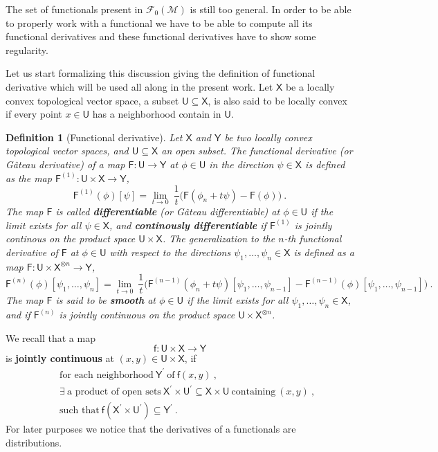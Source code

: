 \documentclass[11pt]{book}
\newcommand{\Fcal}{\mathcal{F}}
\newcommand{\Mcal}{\mathcal{M}}
\newcommand{\Fsf}{\mathsf{F}}
\newcommand{\Usf}{\mathsf{U}}
\newcommand{\Xsf}{\mathsf{X}}
\newcommand{\Ysf}{\mathsf{Y}}
\newcommand{\fsf}{\mathsf{f}}
\theoremstyle{break}
\newtheorem{definition}{Definition}[chapter]
\begin{document}
The set of functionals present in $\Fcal_0(\Mcal)$ is still too general. In order to be able to properly work with a functional we have to be able to compute all its functional derivatives and these functional derivatives have to show some regularity.


Let us start formalizing this discussion giving the definition of functional derivative which will be used all along in the present work. Let $\Xsf$ be a locally convex topological vector space, a subset $\Usf \subseteq \Xsf$, is also said to be locally convex if every point $x \in \Usf$ has a neighborhood contain in $\Usf$. 


\begin{definition}[Functional derivative]\label{def:functional_derivative}
Let $\Xsf$ and $\Ysf$ be two locally convex topological vector spaces, and $\Usf \subseteq \Xsf$ an open subset. The functional derivative (or Gâteau derivative) of a map $\Fsf:  \Usf \to \Ysf$ at $\phi \in \Usf$ in the direction $\psi \in \Xsf$ is defined as the map $\Fsf^{(1)} : \Usf \times \Xsf \to \Ysf$,
%
\begin{equation*}
\Fsf^{(1)}(\phi)[\psi] = \lim_{t \to 0} \ \frac{1}{t} \bigg( \Fsf(\phi_n + t \psi) - \Fsf(\phi) \bigg) \ .
\end{equation*}
% 
The map $\Fsf$ is called \textbf{differentiable} (or Gâteau differentiable) at $\phi \in \Usf$ if the limit exists for all $\psi \in \Xsf$, and \textbf{continously differentiable} if $\Fsf^{(1)}$ is jointly continous on the product space $\Usf \times \Xsf$.
%
%
The generalization to the $n$-th functional derivative of $\Fsf$ at $\phi \in \Usf$ with respect to the directions $\psi_1, \dots, \psi_n \in \Xsf$ is defined as a map $\Fsf : \Usf \times \Xsf^{\otimes n} \to \Ysf$,
%
\begin{equation*}
\Fsf^{(n)}(\phi)[\psi_1,\dots ,\psi_n] = \lim_{t \to 0} \ \frac{1}{t} \bigg( \Fsf^{(n-1)}(\phi_n + t \psi)[\psi_1,\dots ,\psi_{n-1}] - \Fsf^{(n-1)}(\phi)[\psi_1,\dots ,\psi_{n-1}] \bigg) \ .
\end{equation*}
%
The map $\Fsf$ is said to be \textbf{smooth} at $\phi \in \Usf$ if the limit exists for all $\psi_1, \dots, \psi_n \in \Xsf$, and if $\Fsf^{(n)}$ is jointly continuous on the product space $\Usf \times \Xsf^{\otimes n}$.
\end{definition}


We recall that a map 
%
\begin{equation*}
\fsf : \Usf \times \Xsf \to \Ysf
\end{equation*}
%
is \textbf{jointly continuous} at $(x,y) \in \Usf \times \Xsf$, if 
%
\begin{eqnarray*}
&& \mbox{for each neighborhood} \ \Ysf^\prime \ \mbox{of} \ \fsf(x,y) \ , \\
&& \exists \ \mbox{a product of open sets} \ \Xsf^\prime \times \Usf^\prime \subseteq \Xsf \times \Usf \ \mbox{containing} \ (x,y) \ , \\
&& \mbox{such that} \ \fsf(\Xsf^\prime \times \Usf^\prime) \subseteq \Ysf^\prime \ .
\end{eqnarray*}
%
For later purposes we notice that the derivatives of a functionals are distributions.
\end{document}
